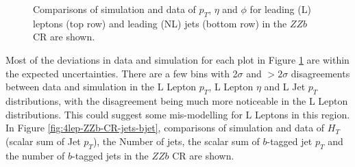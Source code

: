 \begin{figure}[htbp]
\begin{tabular}{ccc}
  \end{tabular}
    \caption{Comparisons of simulation and data of $p_{T}$, $\eta$ and $\phi$ for leading (L) leptons (top row) and leading (NL) jets (bottom row) in the $ZZb$ CR are shown.}
  \label{fig:4lep-ZZb-CR-leptonPlots}
\end{figure}Most of the deviations in data and simulation for each plot in Figure \ref{fig:4lep-ZZb-CR-leptonPlots} are within the expected uncertainties. There are a few bins with 2$\sigma$ and $> 2\sigma$ disagreements between data and simulation in the L Lepton $p_{T}$, L Lepton $\eta$ and L Jet $p_{T}$ distributions, with the disagreement being much more noticeable in the L Lepton distributions. This could suggest some mis-modelling for L Leptons in this region. In Figure \ref{fig:4lep-ZZb-CR-jets-bjet}, comparisons of simulation and data of $H_{T}$ (scalar sum of Jet $p_{T}$), the Number of jets, the scalar sum of $b$-tagged jet $p_{T}$ and the number of $b$-tagged jets in the $ZZb$ CR are shown.
